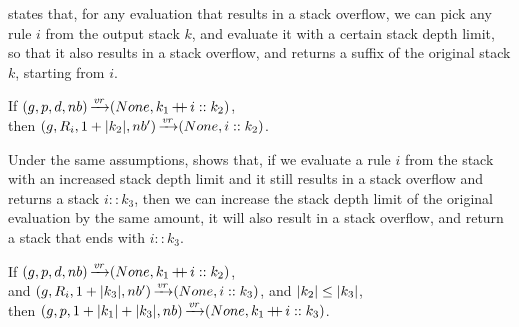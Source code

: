 


 states that,
for any evaluation that results in a stack overflow,
we can pick any rule $i$ from the output stack $k$,
and evaluate it with a certain stack depth limit,
so that it also results in a stack overflow,
and returns a suffix of the original stack $k$,
starting from $i$.

\begin{lemma}%
    If $(g,p,d,nb) \operatorname{\xrightarrow{\mathit{vr}}} (None,k_1 \operatorname{+\kern -0.4em+} i :: k_2)$, \\
    then $(g,R_{i},1+|k_2|,nb') \operatorname{\xrightarrow{\mathit{vr}}} (None,i :: k_2)$.
    \label{lemma:ff-for-lr-patterns}
\end{lemma}

Under the same assumptions,
 shows that,
if we evaluate a rule $i$ from the stack
with an increased stack depth limit
and it still results in a stack overflow
and returns a stack $i :: k_3$,
then we can increase the stack depth limit
of the original evaluation by the same amount,
it will also result in a stack overflow,
and return a stack that ends with $i :: k_3$.

\begin{lemma}%
    If $(g,p,d,nb) \operatorname{\xrightarrow{\mathit{vr}}} (None,k_1 \operatorname{+\kern -0.4em+} i :: k_2)$, \\
    and $(g,R_{i},1+|k_3|,nb') \operatorname{\xrightarrow{\mathit{vr}}} (None,i :: k_3)$,
    and $|k_2| \le |k_3|$, \\
    then $(g,p,1 + |k_1| + |k_3|,nb) \operatorname{\xrightarrow{\mathit{vr}}} (None,k_1 \operatorname{+\kern -0.4em+} i :: k_3)$.
    \label{lemma:d-increase-lr}
\end{lemma}

